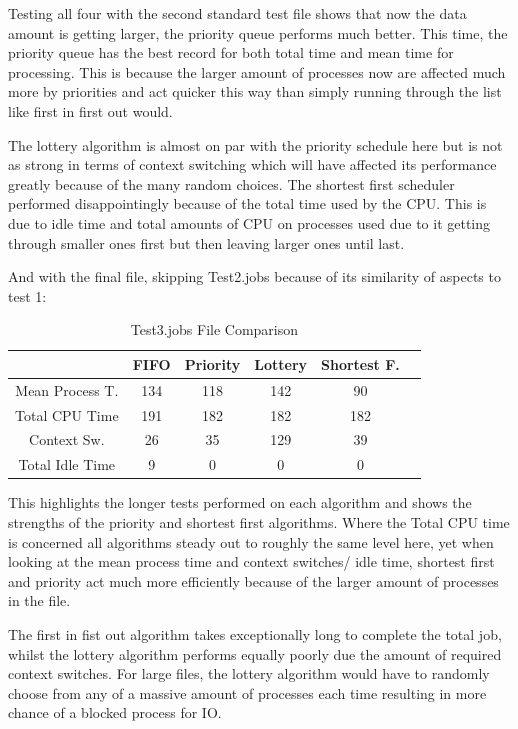 \documentclass{sig-alternate}
\begin{document}
Testing all four with the second standard test file shows that now the data
amount is getting larger, the priority queue performs much better. This time,
the priority queue has the best record for both total time and mean time for
processing. This is because the larger amount of processes now are affected much
more by priorities and act quicker this way than simply running through the list
like first in first out would.

 The lottery algorithm is almost on par with the priority schedule here but is
not as strong in terms of context switching which will have affected its
performance greatly because of the many random choices. The shortest first
scheduler performed disappointingly because of the total time used by the CPU.
This is due to idle time and total amounts of CPU on processes used due to it
getting through smaller ones first but then leaving larger ones until last.
\vspace{3mm}

And with the final file, skipping Test2.jobs because of its similarity of
aspects to test 1:

\begin{table}[!h]
\centering
\caption{Test3.jobs File Comparison}
\begin{tabular}{|c|c|c|c|c|c|} \hline
&FIFO&Priority&Lottery&Shortest F.\\ \hline
Mean Process T.&134&118&142&90\\ \hline
Total CPU Time&191&182&182&182\\ \hline
Context Sw.&26&35&129&39\\ \hline
Total Idle Time&9&0&0&0\\ \hline
\end{tabular}
\end{table}

This highlights the longer tests performed on each algorithm and shows the
strengths of the priority and shortest first algorithms. Where the Total CPU
time is concerned all algorithms steady out to roughly the same level here, yet
when looking at the mean process time and context switches/ idle time, shortest
first and priority act much more efficiently because of the larger amount of
processes in the file. 

The first in fist out algorithm takes exceptionally long to complete the total
job, whilst the lottery algorithm performs equally poorly due the amount of
required context switches. For large files, the lottery algorithm would have to
randomly choose from any of a massive amount of processes each time resulting in
more chance of a blocked process for IO.
\vspace{3mm}
\end{document}
